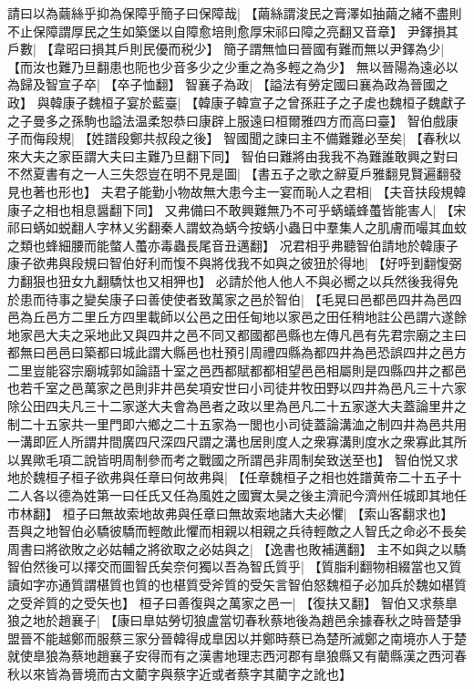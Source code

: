 請曰以為繭絲乎抑為保障乎簡子曰保障哉|{
	【繭絲謂浚民之膏澤如抽繭之緒不盡則不止保障謂厚民之生如築堡以自障愈培則愈厚宋祁曰障之亮翻又音章】}
尹鐸損其戶數|{
	【韋昭曰損其戶則民優而税少】}
簡子謂無恤曰晉國有難而無以尹鐸為少|{
	【而汝也難乃旦翻患也阨也少音多少之少重之為多輕之為少】}
無以晉陽為遠必以為歸及智宣子卒|{
	【卒子恤翻】}
智襄子為政|{
	【謚法有勞定國曰襄為政為晉國之政】}
與韓康子魏桓子宴於藍臺|{
	【韓康子韓宣子之曾孫莊子之子䖍也魏桓子魏獻子之子曼多之孫駒也謚法温柔恕恭曰康辟上服遠曰桓爾雅四方而高曰臺】}
智伯戲康子而侮段規|{
	【姓譜段鄭共叔段之後】}
智國聞之諫曰主不備難難必至矣|{
	【春秋以來大夫之家臣謂大夫曰主難乃旦翻下同】}
智伯曰難將由我我不為難誰敢興之對曰不然夏書有之一人三失怨豈在明不見是圖|{
	【書五子之歌之辭夏戶雅翻見賢遍翻發見也著也形也】}
夫君子能勤小物故無大患今主一宴而恥人之君相|{
	【夫音扶段規韓康子之相也相息醤翻下同】}
又弗備曰不敢興難無乃不可乎蜹蟻蜂蠆皆能害人|{
	【宋祁曰蜹如蜕翻人字林乂劣翻秦人謂蚊為蜹今按蜹小蟲日中羣集人之肌膚而嘬其血蚊之類也蜂細腰而能螫人蠆亦毒蟲長尾音丑邁翻】}
况君相乎弗聽智伯請地於韓康子康子欲弗與段規曰智伯好利而愎不與將伐我不如與之彼狃於得地|{
	【好呼到翻愎弼力翻狠也狃女九翻驕忲也又相狎也】}
必請於他人他人不與必嚮之以兵然後我得免於患而待事之變矣康子曰善使使者致萬家之邑於智伯|{
	【毛晃曰邑都邑四井為邑四邑為丘邑方二里丘方四里載師以公邑之田任甸地以家邑之田任稍地註公邑謂六遂餘地家邑大夫之采地此又與四井之邑不同又都國都邑縣也左傳凡邑有先君宗廟之主曰都無曰邑邑曰築都曰城此謂大縣邑也杜預引周禮四縣為都四井為邑恐誤四井之邑方二里豈能容宗廟城郭如論語十室之邑西都賦都都相望邑邑相屬則是四縣四井之都邑也若千室之邑萬家之邑則非井邑矣項安世曰小司徒井牧田野以四井為邑凡三十六家除公田四夫凡三十二家遂大夫會為邑者之政以里為邑凡二十五家遂大夫蓋論里井之制二十五家共一里門即六鄉之二十五家為一閭也小司徒蓋論溝洫之制四井為邑共用一溝即匠人所謂井間廣四尺深四尺謂之溝也居則度人之衆寡溝則度水之衆寡此其所以異歟毛項二說皆明周制參而考之戰國之所謂邑非周制矣致送至也】}
智伯悦又求地於魏桓子桓子欲弗與任章曰何故弗與|{
	【任章魏桓子之相也姓譜黄帝二十五子十二人各以德為姓第一曰任氏又任為風姓之國實太昊之後主濟祀今濟州任城即其地任市林翻】}
桓子曰無故索地故弗與任章曰無故索地諸大夫必懼|{
	【索山客翻求也】}
吾與之地智伯必驕彼驕而輕敵此懼而相親以相親之兵待輕敵之人智氏之命必不長矣周書曰將欲敗之必姑輔之將欲取之必姑與之|{
	【逸書也敗補邁翻】}
主不如與之以驕智伯然後可以擇交而圖智氏矣奈何獨以吾為智氏質乎|{
	【質脂利翻物相綴當也又質讀如字亦通質謂椹質也質的也椹質受斧質的受矢言智伯怒魏桓子必加兵於魏如椹質之受斧質的之受矢也】}
桓子曰善復與之萬家之邑一|{
	【復扶又翻】}
智伯又求蔡臯狼之地於趙襄子|{
	【康曰臯姑勞切狼盧當切春秋蔡地後為趙邑余據春秋之時晉楚爭盟晉不能越鄭而服蔡三家分晉韓得成臯因以并鄭時蔡已為楚所滅鄭之南境亦人于楚就使臯狼為蔡地趙襄子安得而有之漢書地理志西河郡有臯狼縣又有藺縣漢之西河春秋以來皆為晉境而古文藺字與蔡字近或者蔡字其藺字之訛也】}
